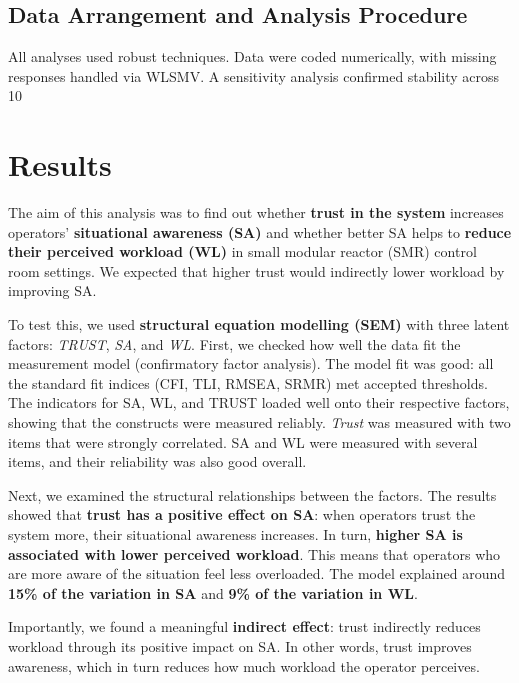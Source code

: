 \documentclass[conference]{IEEEtran}
\begin{document}
\subsection{Data Arrangement and Analysis Procedure}
All analyses used robust techniques. Data were coded numerically, with missing responses handled via WLSMV. A sensitivity analysis confirmed stability across 10%

\section{Results}

The aim of this analysis was to find out whether \textbf{trust in the system} increases operators’ \textbf{situational awareness (SA)} and whether better SA helps to \textbf{reduce their perceived workload (WL)} in small modular reactor (SMR) control room settings. We expected that higher trust would indirectly lower workload by improving SA.

To test this, we used \textbf{structural equation modelling (SEM)} with three latent factors: \textit{TRUST}, \textit{SA}, and \textit{WL}. First, we checked how well the data fit the measurement model (confirmatory factor analysis). The model fit was good: all the standard fit indices (CFI, TLI, RMSEA, SRMR) met accepted thresholds. The indicators for SA, WL, and TRUST loaded well onto their respective factors, showing that the constructs were measured reliably. \textit{Trust} was measured with two items that were strongly correlated. SA and WL were measured with several items, and their reliability was also good overall.

Next, we examined the structural relationships between the factors. The results showed that \textbf{trust has a positive effect on SA}: when operators trust the system more, their situational awareness increases. In turn, \textbf{higher SA is associated with lower perceived workload}. This means that operators who are more aware of the situation feel less overloaded. The model explained around \textbf{15\% of the variation in SA} and \textbf{9\% of the variation in WL}.

Importantly, we found a meaningful \textbf{indirect effect}: trust indirectly reduces workload through its positive impact on SA. In other words, trust improves awareness, which in turn reduces how much workload the operator perceives.
\end{document}
